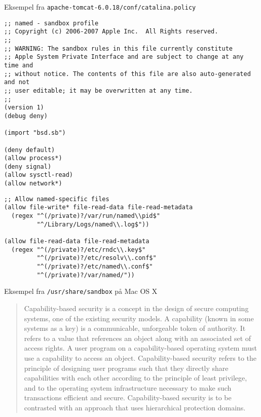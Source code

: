 \documentclass[Screen16to9,17pt]{foils}
\begin{document}
\begin{list1}
\item Eksempel fra \verb+apache-tomcat-6.0.18/conf/catalina.policy+
\end{list1}



\begin{verbatim}
;; named - sandbox profile
;; Copyright (c) 2006-2007 Apple Inc.  All Rights reserved.
;;
;; WARNING: The sandbox rules in this file currently constitute
;; Apple System Private Interface and are subject to change at any time and
;; without notice. The contents of this file are also auto-generated and not
;; user editable; it may be overwritten at any time.
;;
(version 1)
(debug deny)

(import "bsd.sb")

(deny default)
(allow process*)
(deny signal)
(allow sysctl-read)
(allow network*)
\end{verbatim}



\begin{verbatim}
;; Allow named-specific files
(allow file-write* file-read-data file-read-metadata
  (regex "^(/private)?/var/run/named\\pid$"
         "^/Library/Logs/named\\.log$"))

(allow file-read-data file-read-metadata
  (regex "^(/private)?/etc/rndc\\.key$"
         "^(/private)?/etc/resolv\\.conf$"
         "^(/private)?/etc/named\\.conf$"
         "^(/private)?/var/named/"))
\end{verbatim}

\begin{list1}
\item Eksempel fra \verb+/usr/share/sandbox+ på Mac OS X
\end{list1}



\begin{quote}
  Capability-based security is a concept in the design of secure computing systems, one of the existing security models. A capability (known in some systems as a key) is a communicable, unforgeable token of authority. It refers to a value that references an object along with an associated set of access rights. A user program on a capability-based operating system must use a capability to access an object. Capability-based security refers to the principle of designing user programs such that they directly share capabilities with each other according to the principle of least privilege, and to the operating system infrastructure necessary to make such transactions efficient and secure. Capability-based security is to be contrasted with an approach that uses hierarchical protection domains.
\end{quote}
\end{document}
